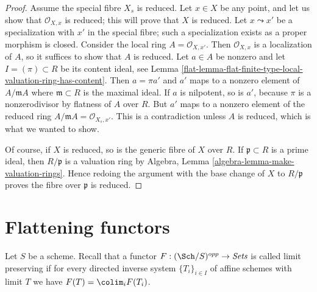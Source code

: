 \begin{proof}

Assume the special fibre $X_s$ is reduced.
Let $x \in X$ be any point, and let us show that $\mathcal{O}_{X, x}$
is reduced; this will prove that $X$ is reduced.
Let $x \leadsto x'$ be a specialization with $x'$
in the special fibre; such a specialization exists
as a proper morphism is closed. Consider the local
ring $A = \mathcal{O}_{X, x'}$. Then $\mathcal{O}_{X, x}$
is a localization of $A$, so it suffices to show that
$A$ is reduced. Let $a \in A$ be nonzero and let $I = (\pi) \subset R$ be its
content ideal, see
Lemma \ref{flat-lemma-flat-finite-type-local-valuation-ring-has-content}.
Then $a = \pi a'$ and $a'$ maps to a nonzero element of
$A/\mathfrak mA$ where $\mathfrak m \subset R$ is the maximal ideal.
If $a$ is nilpotent, so is $a'$, because $\pi$ is a nonzerodivisor
by flatness of $A$ over $R$.
But $a'$ maps to a nonzero element of the reduced ring
$A/\mathfrak m A = \mathcal{O}_{X_s, x'}$.
This is a contradiction unless $A$ is reduced, which
is what we wanted to show.

\medskip\noindent
Of course, if $X$ is reduced, so is the generic fibre of $X$ over $R$.
If $\mathfrak p \subset R$ is a
prime ideal, then $R/\mathfrak p$ is a valuation ring by
Algebra, Lemma \ref{algebra-lemma-make-valuation-rings}.
Hence redoing the argument with the base change of $X$
to $R/\mathfrak p$ proves the fibre over $\mathfrak p$
is reduced.
\end{proof}

\section{Flattening functors}
\label{flat-section-flattening-functors}
Let $S$ be a scheme. Recall that a functor
$F : (\Sch/S)^{opp} \to \textit{Sets}$ is called limit preserving
if for every directed inverse system
$\{T_i\}_{i \in I}$ of affine schemes with limit $T$ we have
$F(T) = \colim_i F(T_i)$.

